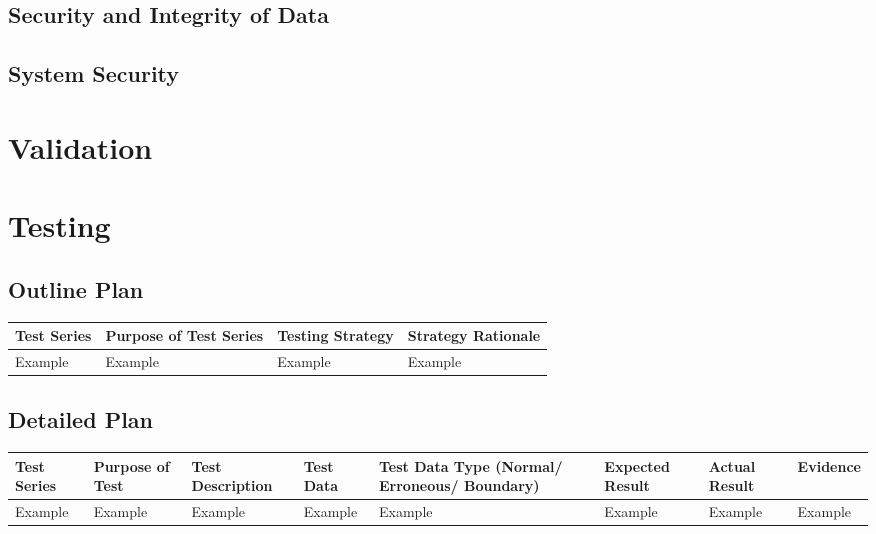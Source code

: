\subsection{Security and Integrity of Data}

\subsection{System Security}

\section{Validation}

\section{Testing}

\begin{landscape}
\subsection{Outline Plan}

\begin{center}
    \begin{tabular}{|p{2cm}|p{5cm}|p{5cm}|p{4cm}|}
        \hline
        \textbf{Test Series} & \textbf{Purpose of Test Series} & \textbf{Testing Strategy} & \textbf{Strategy Rationale}\\ \hline
        Example & Example & Example & Example \\ \hline
    \end{tabular}
\end{center}

\subsection{Detailed Plan}

\begin{center}
    \begin{longtable}{|p{1.5cm}|p{2.5cm}|p{2.5cm}|p{2cm}|p{2cm}|p{2cm}|p{2cm}|p{2cm}|}
        \hline
        \textbf{Test Series} & \textbf{Purpose of Test} & \textbf{Test Description} & \textbf{Test Data} & \textbf{Test Data Type (Normal/ Erroneous/ Boundary)} & \textbf{Expected Result} & \textbf{Actual Result} & \textbf{Evidence}\\ \hline
        Example & Example & Example & Example & Example & Example & Example & Example \\ \hline
    \end{longtable}
\end{center}
\end{landscape}